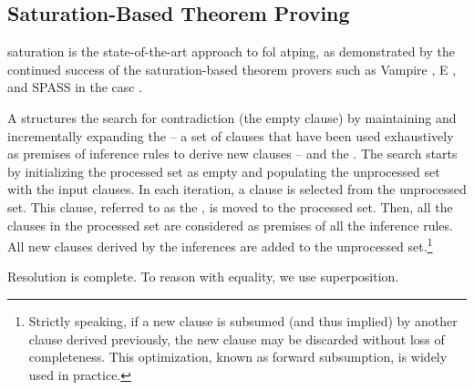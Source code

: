 \subsection{Saturation-Based Theorem Proving}

\Gls{saturation} is the state-of-the-art approach to \gls{fol} \gls{atping},
as demonstrated by the continued success of the saturation-based theorem provers such as Vampire \cite{DBLP:conf/cav/KovacsV13}, E \cite{DBLP:conf/cade/0001CV19}, and SPASS \cite{DBLP:conf/cade/WeidenbachDFKSW09} in the \gls{casc} \cite{Sut16}.

A  structures the search for contradiction
(the empty clause)
by maintaining and incrementally expanding the 
-- a set of clauses that have been used exhaustively as premises of inference rules to derive new clauses -- and the .
The search starts by initializing the processed set as empty and populating the unprocessed set with the input clauses.
In each iteration,
a clause is selected from the unprocessed set.
This clause, referred to as the , is moved to the processed set.
Then, all the clauses in the processed set are considered as premises of all the inference rules.
All new clauses derived by the inferences are added to the unprocessed set.\footnote{Strictly speaking, if a new clause is subsumed (and thus implied) by another clause derived previously, the new clause may be discarded without loss of completeness. This optimization, known as forward subsumption, is widely used in practice.}


Resolution is complete.
To reason with equality, we use superposition.

